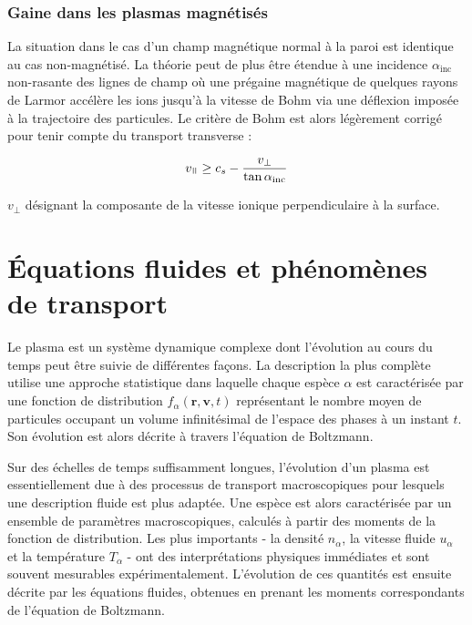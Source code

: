 \begin{refsection}



\subsubsection{Gaine dans les plasmas magnétisés}
La situation dans le cas d'un champ magnétique normal à la paroi est
identique au cas non-magnétisé. La théorie peut de plus être étendue 
à une incidence $\alpha_\text{inc}$ non-rasante des lignes de champ où une
prégaine magnétique de quelques rayons de Larmor accélère les ions jusqu'à la
vitesse de Bohm via une déflexion imposée à la trajectoire des particules. Le
critère de Bohm est alors légèrement corrigé pour tenir compte du transport transverse
\cite{Stangeby} :

\begin{equation}
	v_\para\geq
	c_{s}-\frac{v_\perp}{\tan{\alpha_\text{inc}}}
\end{equation}
 
 $v_\perp$ désignant la composante de la vitesse ionique perpendiculaire à la
 surface. 
 
 

\section{Équations fluides et phénomènes de transport}
\label{Maxwell-Boltzmann}

Le plasma est un système dynamique complexe dont l'évolution au cours du temps
peut être suivie de différentes façons. La description la plus complète utilise
une approche statistique dans laquelle chaque espèce $\alpha$ est caractérisée
par une fonction de distribution $f_\alpha(\mathbf{r},\mathbf{v},t)$
représentant le nombre moyen de particules occupant un volume infinitésimal
de l'espace des phases à un instant $t$. Son évolution est alors décrite à
travers l'équation de Boltzmann.

Sur des échelles de temps suffisamment longues, l'évolution d'un plasma est 
essentiellement due à des processus de transport macroscopiques pour lesquels
une description fluide est plus adaptée. Une espèce est alors
caractérisée par un ensemble de paramètres macroscopiques, calculés à
partir des moments de la fonction de distribution. Les plus importants -
la densité $n_\alpha$, la vitesse fluide $u_\alpha$ et la température $T_\alpha$
- ont des interprétations physiques immédiates et sont souvent mesurables
expérimentalement. L'évolution de ces quantités est ensuite décrite par les
équations fluides, obtenues en prenant les moments correspondants de l'équation de Boltzmann.


\end{refsection}
